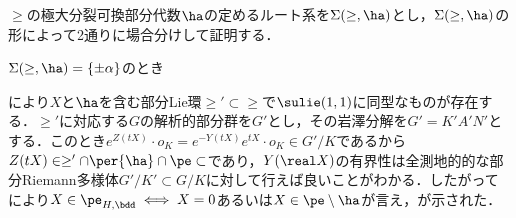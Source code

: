 \begin{npfwn}
  $\ge$の極大分裂可換部分代数$\ha$の定めるルート系を$\Sigma(\ge,\ha) $とし，$\Sigma(\ge,\ha) $の形によって2通りに場合分けして証明する．
  
  \begin{case}
    $\Sigma(\ge,\ha) = \{\pm\alpha \}$のとき
    
    により$X$と$\ha $を含む部分Lie環$\ge' \subset \ge $で$\sulie(1,1) $に同型なものが存在する．$\ge' $に対応する$G$の解析的部分群を$G'$とし，その岩澤分解を$G' = K'A'N' $とする．このとき$e^{Z(t X)}\cdot o_K = e^{-Y(tX)}e^{tX}\cdot o_K\in G'/K $であるから$Z(tX)\in \ge'\cap \per{\ha}\cap \pe\subset  $であり，$Y(\real X) $の有界性は全測地的的な部分Riemann多様体$G'/K'\subset G/K$に対して行えば良いことがわかる．したがってにより$X\in\pe_{H,\bdd}\iff X = 0 $あるいは$X\in \pe\setminus\ha $が言え，が示された．
    

    
    
    


\end{case}
\end{npfwn}
